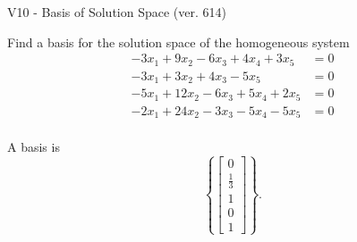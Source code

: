 \begin{exercise}
  \begin{exerciseTitle}V10 - Basis of Solution Space (ver. 614)\end{exerciseTitle}
  \begin{exerciseStatement}
    Find a basis for the solution space of the homogeneous system 
\begin{align*}
 -3 x_ 1 + 9 x_ 2 -6 x_ 3 + 4 x_ 4 + 3 x_ 5 &= 0  \\ 
  -3 x_ 1 + 3 x_ 2 + 4 x_ 3 -5 x_ 5 &= 0  \\ 
  -5 x_ 1 + 12 x_ 2 -6 x_ 3 + 5 x_ 4 + 2 x_ 5 &= 0  \\ 
  -2 x_ 1 + 24 x_ 2 -3 x_ 3 -5 x_ 4 -5 x_ 5 &= 0  \\ 
 \end{align*}


 
  \end{exerciseStatement}

  \begin{exerciseAnswer}
   A basis is   
\[\left\{\left[\begin{array}{c}
0 \\
\frac{1}{3} \\
1 \\
0 \\
1
\end{array}\right]\right\}.\]

  


  \end{exerciseAnswer}
\end{exercise}